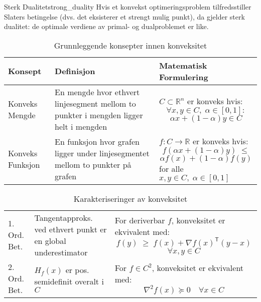 \begin{theorem}{Sterk Dualitet}{strong_duality}
	Hvis et konvekst optimeringsproblem tilfredsstiller Slaters betingelse (dvs. det eksisterer et strengt mulig punkt), da gjelder sterk dualitet: de optimale verdiene av primal- og dualproblemet er like.
\end{theorem}

\begin{table}[H]
	\centering
	\begin{tabular}{|p{3cm}|p{5cm}|p{6cm}|}
		\hline
		\rowcolor{blue!25}
		\textbf{Konsept} & \textbf{Definisjon}                                                                   & \textbf{Matematisk Formulering} \\
		\hline
		Konveks Mengde   & En mengde hvor ethvert linjesegment mellom to punkter i mengden ligger helt i mengden &
		\(C\subset \mathbb{R}^n\) er konveks hvis:
		\[\forall x,y\in C,\;\alpha\in [0,1]:\]
		\[\alpha x + (1-\alpha) y\in C\]                                                                                                           \\
		\hline
		\rowcolor{blue!5}
		Konveks Funksjon & En funksjon hvor grafen ligger under linjesegmentet mellom to punkter på grafen       &
		\(f: C \to \mathbb{R}\) er konveks hvis:
		\[f(\alpha x + (1-\alpha) y)\;\le\]\[\alpha f(x) + (1-\alpha) f(y)\]
		for alle \(x,y\in C,\;\alpha\in [0,1]\)                                                                                                    \\
		\hline
	\end{tabular}
	\caption{Grunnleggende konsepter innen konveksitet}
	\label{tab:basic_concepts}
\end{table}

\begin{table}[H]
	\centering
	\begin{tabular}{|p{3cm}|p{5cm}|p{6cm}|}
		\hline
		\rowcolor{rem-color!25}
		\multicolumn{3}{|l|}{\textbf{Karakteriseringer av Konveksitet}}                \\
		\hline
		\rowcolor{rem-color!5}
		1. Ord. Bet. & Tangentapproks. ved ethvert punkt er en global underestimator &
		For deriverbar \(f\), konveksitet er ekvivalent med:
		\[f(y)\;\ge\; f(x) + \nabla f(x)^\mathsf{T} (y - x)\]
		\[\forall x,y \in C\]                                                          \\
		\hline
		2. Ord. Bet. & \(H_f(x)\) er pos. semidefinit overalt i \(C\)                &
		For \(f \in C^2\), konveksitet er ekvivalent med:
		\[\nabla^2 f(x) \succeq 0\quad \forall x \in C\]                               \\
		\hline
	\end{tabular}
	\caption{Karakteriseringer av konveksitet}
	\label{tab:characterizations}
\end{table}

